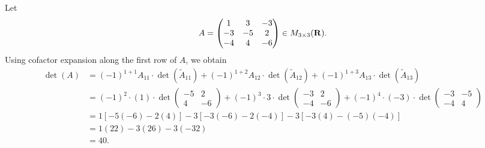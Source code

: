 \begin{example} \label{example 4.2.1}
Let
\[
    A = \begin{pmatrix}
        1 & 3 & -3 \\
        -3 & -5 & 2 \\
        -4 & 4 & -6
    \end{pmatrix} \in M_{3 \times 3}(\mathbf{R}).
\]
Using cofactor expansion along the first row of \(A\), we obtain
\begin{align*}
    \det(A) & = (-1)^{1 + 1} A_{11} \cdot \det(\tilde{A}_{11}) + (-1)^{1 + 2} A_{12} \cdot \det(\tilde{A}_{12}) + (-1)^{1 + 3} A_{13} \cdot \det(\tilde{A}_{13}) \\
            & = (-1)^2 \cdot (1) \cdot
                    \det \begin{pmatrix}
                        -5 & 2 \\ 4 & -6
                    \end{pmatrix}
	          + (-1)^3 \cdot 3 \cdot
	                \det \begin{pmatrix}
                        -3 & 2 \\ -4 & -6
                    \end{pmatrix}
              + (-1)^4 \cdot (-3) \cdot
                    \det \begin{pmatrix}
                        -3 & -5 \\ -4 & 4
                    \end{pmatrix} \\
            & = 1 [-5(-6) - 2(4)] - 3[-3(-6) - 2(-4)] - 3[-3(4) - (-5)(-4)] \\
            & = 1(22) - 3(26) - 3(-32) \\
            & = 40.
\end{align*}
\end{example}

